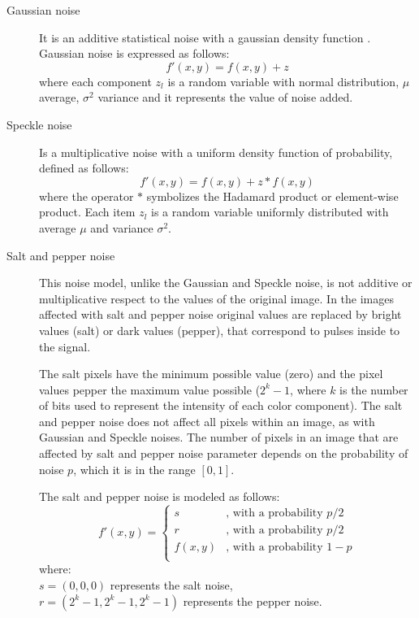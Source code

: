 \begin{description}
	
\item[Gaussian noise] It is an additive statistical noise with a gaussian density function \cite{davenport1958random}. Gaussian noise is expressed as follows:
\begin{equation}
\label{eq:gaussian_noise}
f'(x, y) = f(x, y) + z
\end{equation}
where each component $z_l$ is a random variable with normal distribution, $\mu$ average, $\sigma^2$ variance and it represents the value of noise added.

\item[Speckle noise] Is a multiplicative noise with a uniform density function of probability, defined as follows: 
\begin{equation}
\label{eq:speckle}
f'(x, y) = f(x, y) + z \ast f(x, y)  
\end{equation}
where the operator $\ast$ symbolizes the Hadamard product or element-wise product. Each item $z_l$ is a random variable uniformly distributed with average $\mu$ and variance $\sigma^2$.

\item[Salt and pepper noise] This noise model, unlike the Gaussian and Speckle noise, is not additive or multiplicative respect to the values of the original image. In the images affected with salt and pepper noise original values are replaced by bright values (salt) or dark values (pepper), that correspond to pulses inside to the signal. 

The salt pixels have the minimum possible value (zero)  and the pixel values pepper the maximum value possible ($2^k - 1$, where $k$ is the number of bits used to represent the intensity of each color component). The salt and pepper noise does not affect all pixels within an image, as with Gaussian and Speckle noises. The number of pixels in an image that are affected by salt and pepper noise parameter depends on the probability of noise $p$, which it is in the range $[0, 1]$.

The salt and pepper noise is modeled as follows:
\begin{equation}
\label{eq:salt_and_pepper}
f'(x, y)=\left\{ \begin{array}{cl}
s & \text{, with a probability } p/2 \\
r & \text{, with a probability } p/2 \\
f(x, y) & \text{, with a probability } 1 - p \\
\end{array}\right.
\end{equation}
where:\\ $s = (0, 0, 0)$ represents the salt noise,\\ $r = (2^k - 1, 2^k - 1, 2^k - 1 )$ represents the pepper noise.

\end{description}


